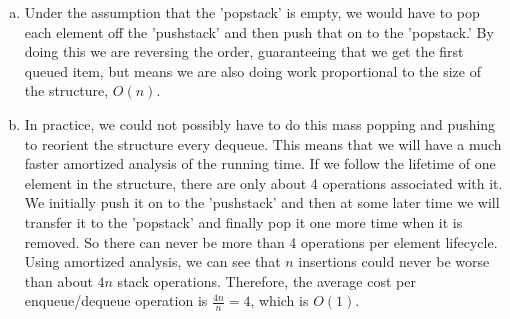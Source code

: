 \documentclass[a4paper,12pt]{article}
\begin{document}
\begin{enumerate}[a)]

\item Under the assumption that the 'popstack' is empty, we would have
  to pop each element off the 'pushstack' and then push that on to the
  'popstack.' By doing this we are reversing the order, guaranteeing
  that we get the first queued item, but means we are also doing work
  proportional to the size of the structure, $O(n)$.

\item In practice, we could not possibly have to do this mass popping
  and pushing to reorient the structure every dequeue. This means that
  we will have a much faster amortized analysis of the running
  time. If we follow the lifetime of one element in the structure,
  there are only about 4 operations associated with it. We initially
  push it on to the 'pushstack' and then at some later time we will
  transfer it to the 'popstack' and finally pop it one more time when
  it is removed. So there can never be more than 4 operations per
  element lifecycle. Using amortized analysis, we can see that $n$
  insertions could never be worse than about $4n$ stack
  operations. Therefore, the average cost per enqueue/dequeue
  operation is $\frac{4n}{n} = 4$, which is $O(1)$.
  
\end{enumerate}
\end{document}
